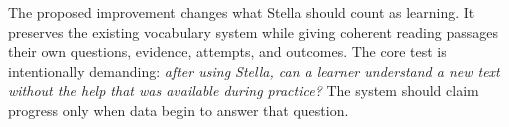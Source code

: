 \documentclass[conference,10pt]{IEEEtran}
\begin{document}
The proposed improvement changes what Stella should count as learning. It preserves the existing vocabulary system while giving coherent reading passages their own questions, evidence, attempts, and outcomes. The core test is intentionally demanding: \emph{after using Stella, can a learner understand a new text without the help that was available during practice?} The system should claim progress only when data begin to answer that question.

\balance


\end{document}
